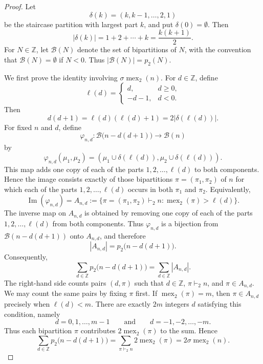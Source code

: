 \documentclass[10pt,a4paper]{amsart}
\newcommand{\mex}{\operatorname{mex}}
\begin{document}
\begin{proof}
Let
\[
\delta(k)=(k,k-1,\ldots,2,1)
\]
be the staircase partition with largest part $k$, and put $\delta(0)=\emptyset$.  Then
\[
|\delta(k)|=1+2+\cdots+k=\frac{k(k+1)}2.
\]
For $N\in\mathbb Z$, let $\mathcal B(N)$ denote the set of bipartitions of $N$, with the convention that $\mathcal B(N)=\emptyset$ if $N<0$.  Thus $|\mathcal B(N)|=p_2(N)$.

We first prove the identity involving $\sigma\mex_2(n)$.  For $d\in\mathbb Z$, define
\[
\ell(d)=
\begin{cases}
d,&d\geq 0,\\
-d-1,&d<0.
\end{cases}
\]
Then
\[
d(d+1)=\ell(d)(\ell(d)+1)=2|\delta(\ell(d))|.
\]
For fixed $n$ and $d$, define
\[
\varphi_{n,d}:\mathcal B\bigl(n-d(d+1)\bigr)\longrightarrow \mathcal B(n)
\]
by
\[
\varphi_{n,d}(\mu_1,\mu_2)=
(\mu_1\cup\delta(\ell(d)),\mu_2\cup\delta(\ell(d))).
\]
This map adds one copy of each of the parts $1,2,\ldots,\ell(d)$ to both components.  Hence the image consists exactly of those bipartitions $\pi=(\pi_1,\pi_2)$ of $n$ for which each of the parts $1,2,\ldots,\ell(d)$ occurs in both $\pi_1$ and $\pi_2$.  Equivalently,
\[
\operatorname{Im}(\varphi_{n,d})
=A_{n,d}:=
\{\pi=(\pi_1,\pi_2)\vdash_2 n: \mex_2(\pi)>\ell(d)\}.
\]
The inverse map on $A_{n,d}$ is obtained by removing one copy of each of the parts $1,2,\ldots,\ell(d)$ from both components.  Thus $\varphi_{n,d}$ is a bijection from $\mathcal B(n-d(d+1))$ onto $A_{n,d}$, and therefore
\[
|A_{n,d}|=p_2\bigl(n-d(d+1)\bigr).
\]
Consequently,
\[
\sum_{d\in\mathbb Z}p_2\bigl(n-d(d+1)\bigr)
=
\sum_{d\in\mathbb Z}|A_{n,d}|.
\]
The right-hand side counts pairs $(d,\pi)$ such that $d\in\mathbb Z$, $\pi\vdash_2 n$, and $\pi\in A_{n,d}$.  We may count the same pairs by fixing $\pi$ first.  If $\mex_2(\pi)=m$, then $\pi\in A_{n,d}$ precisely when $\ell(d)<m$.  There are exactly $2m$ integers $d$ satisfying this condition, namely
\[
d=0,1,\ldots,m-1
\qquad\text{and}\qquad
 d=-1,-2,\ldots,-m.
\]
Thus each bipartition $\pi$ contributes $2\mex_2(\pi)$ to the sum.  Hence
\[
\sum_{d\in\mathbb Z}p_2\bigl(n-d(d+1)\bigr)
=
\sum_{\pi\vdash_2 n}2\mex_2(\pi)
=
2\sigma\mex_2(n).
\]


\end{proof}
\end{document}
